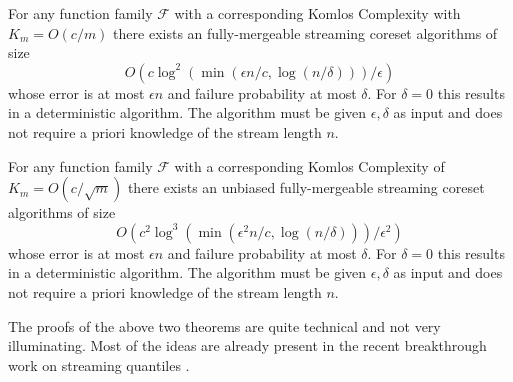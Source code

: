 \documentclass[anon,12pt]{colt2019} %
\newcommand{\eps}{\epsilon}
\newcommand{\F}{\mathcal{F}}
\begin{document}
\begin{theorem} \label{thm:streaming}
For any function family $\F$ with a corresponding Komlos Complexity with $K_m = O(c/m)$ there exists an fully-mergeable streaming coreset algorithms of size 
$$O\left(c\log^2\left(\min(\eps n/c, \log(n/\delta)) \right)/\eps\right)$$ 
whose error is at most $\eps n$ and failure probability at most $\delta$. For $\delta=0$ this results in a deterministic algorithm. The algorithm must be given $\eps, \delta$ as input and does not require a priori knowledge of the stream length $n$.
\end{theorem}

\begin{theorem} \label{thm:streaming2}
For any function family $\F$ with a corresponding Komlos Complexity of $K_m = O(c/\sqrt{m})$ there exists an unbiased fully-mergeable streaming coreset algorithms of size 
$$O\left(c^2\log^3\left(\min(\eps^2 n/c, \log(n/\delta)) \right)/\eps^2\right)$$ 
whose error is at most $\eps n$ and failure probability at most $\delta$. For $\delta=0$ this results in a deterministic algorithm. The algorithm must be given $\eps, \delta$ as input and does not require a priori knowledge of the stream length $n$.
\end{theorem}

The proofs of the above two theorems are quite technical and not very illuminating. Most of the ideas are already present in the recent breakthrough work on streaming quantiles \cite{DBLP:conf/focs/KarninLL16}. 
\end{document}

